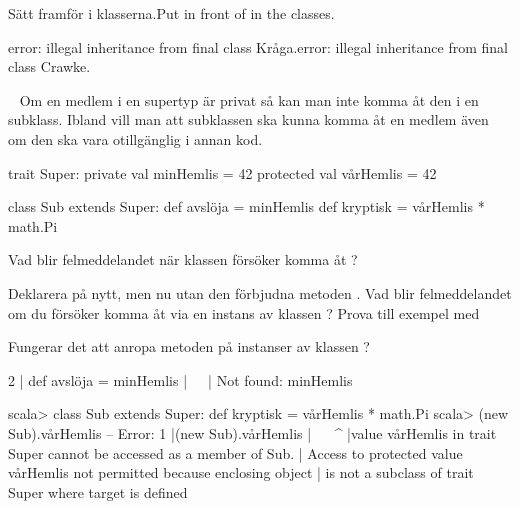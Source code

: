 \SOLUTION


\TaskSolved \what


\SubtaskSolved  \ifswedish Sätt  framför  i klasserna.\else Put  in front of  in the classes.\fi

\SubtaskSolved  \ifswedish error: illegal inheritance from final class Kråga.\else error: illegal inheritance from final class Crawke.\fi


\QUESTEND







\QUESTBEGIN

\Task  \what~  Om en medlem i en supertyp är privat så kan man inte komma åt den i en subklass. Ibland vill man att subklassen ska kunna komma åt en medlem även om den ska vara otillgänglig i annan kod.

\begin{Code}
trait Super:
  private val minHemlis = 42
  protected val vårHemlis = 42

class Sub extends Super:
  def avslöja = minHemlis
  def kryptisk = vårHemlis * math.Pi

\end{Code}

\Subtask Vad blir felmeddelandet när klassen  försöker komma åt ?

\Subtask Deklarera  på nytt, men nu utan den förbjudna metoden . Vad blir felmeddelandet om du försöker komma åt  via en instans av klassen ? Prova till exempel med 

\Subtask Fungerar det att anropa metoden  på instanser av klassen ?

\SOLUTION


\TaskSolved \what


\SubtaskSolved  
\begin{REPL}
2 |  def avslöja = minHemlis
  |                ^^^^^^^^^
  |                Not found: minHemlis
\end{REPL}

\SubtaskSolved  
\begin{REPL}
scala> class Sub extends Super:
         def kryptisk = vårHemlis * math.Pi
scala> (new Sub).vårHemlis
-- Error:
1 |(new Sub).vårHemlis
  |^^^^^^^^^^^^^^^^^^^
  |value vårHemlis in trait Super cannot be accessed as a member of Sub.
  | Access to protected value vårHemlis not permitted because enclosing object 
  | is not a subclass of trait Super where target is defined
\end{REPL}

